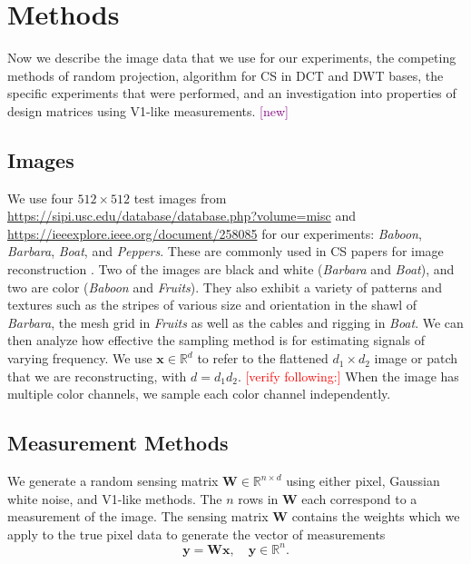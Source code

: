 \documentclass{article}
\newcommand{\todo}[1]{\textcolor{red}{[#1]}}
\renewcommand{\vec}{\mathbf}
\newcommand{\mat}{\mathbf}
\newcommand{\new}[1]{\textcolor{purple}{[#1]}}
\begin{document}
\section{Methods}

Now we describe the image data that we use for our experiments, the competing methods of random projection, algorithm for CS in DCT and DWT bases, the specific experiments that were performed, and an investigation into properties of design matrices using V1-like measurements. \new{new}


\subsection{Images}

We use four $512 \times 512$ test images from \url{https://sipi.usc.edu/database/database.php?volume=misc} and \url{https://ieeexplore.ieee.org/document/258085} \cite{shapiro} for our experiments: \textit{Baboon}, \textit{Barbara}, \textit{Boat}, and \textit{Peppers}.
These are commonly used in CS papers for image reconstruction \cite{parkaleApplicationCompressedSensing2021, sermwuthisarnFastImageRecovery2009}.
Two of the images are black and white (\textit{Barbara} and \textit{Boat}), and two are color (\textit{Baboon} and \textit{Fruits}).
They also exhibit a variety of patterns and textures such as the stripes of various size and orientation in the shawl of \textit{Barbara}, the mesh grid in \textit{Fruits} as well as the cables and rigging in \textit{Boat}.
We can then analyze how effective the sampling method is for estimating signals of varying frequency.
We use $\vec x \in \mathbb{R}^d$ to refer to the flattened $d_1 \times d_2$ image or patch that we are reconstructing, with $d = d_1 d_2$.
\todo{verify following:}
When the image has multiple color channels, we sample each color channel independently.


\subsection{Measurement Methods}

We generate a random sensing matrix $\mat W \in \mathbb{R}^{n \times d}$
using either pixel, Gaussian white noise, and V1-like methods.
The $n$ rows in $\mat W$ each correspond to a measurement of the image.
The sensing matrix $\mat W$ contains the weights which we apply to the true pixel data to generate the vector of measurements
\begin{equation}
  \vec{y} = \mat W \vec{x}, \quad \vec y \in \mathbb{R}^n.
  \label{eq:weighted_observations}
\end{equation}
\end{document}
